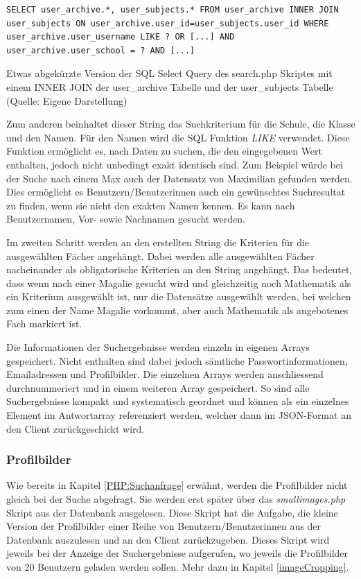 \documentclass[../main.tex]{subfiles}
\begin{document}
	 \begin{code}
	 	\begin{center}
	 		\begin{verbatim}
SELECT user_archive.*, user_subjects.* FROM user_archive INNER JOIN user_subjects ON user_archive.user_id=user_subjects.user_id WHERE user_archive.user_username LIKE ? OR [...] AND user_archive.user_school = ? AND [...]
	 		\end{verbatim}
	 		\caption{Etwas abgekürzte Version der SQL Select Query des search.php Skriptes mit einem INNER JOIN der user\_archive Tabelle und der user\_subjects Tabelle (Quelle: Eigene Darstellung)}\label{SQL:INNERJOIN}
		\end{center}
	\end{code}	
	 
	 Zum anderen beinhaltet dieser String das  Suchkriterium für die Schule, die Klasse und den Namen. Für den Namen wird die SQL Funktion \emph{LIKE} verwendet. Diese Funktion ermöglicht es, nach Daten zu suchen, die den eingegebenen Wert enthalten, jedoch nicht unbedingt exakt identisch sind. Zum Beispiel würde bei der Suche nach einem \glqq Max\grqq{} auch der Datensatz von \glqq Maximilian\grqq{} gefunden werden. Dies ermöglicht es Benutzern/Benutzerinnen auch ein gewünschtes Suchresultat zu finden, wenn sie nicht den exakten Namen kennen. Es kann nach Benutzernamen, Vor- sowie Nachnamen gesucht werden.
	 
	 Im zweiten Schritt werden an den erstellten String die Kriterien für die ausgewählten Fächer angehängt. Dabei werden alle ausgewählten Fächer nacheinander als obligatorische Kriterien an den String angehängt. Das bedeutet, dass wenn nach einer \glqq Magalie\grqq{} gesucht wird und gleichzeitig noch Mathematik als ein Kriterium ausgewählt ist, nur die Datensätze ausgewählt werden, bei welchen zum einen der Name \glqq Magalie\grqq{} vorkommt, aber auch Mathematik als angebotenes Fach markiert ist.
	 
	 Die Informationen der Suchergebnisse werden einzeln in eigenen Arrays gespeichert. Nicht enthalten sind dabei jedoch sämtliche Passwortinformationen, Emailadressen und Profilbilder. Die einzelnen Arrays werden anschliessend durchnummeriert und in einem weiteren Array gespeichert. So sind alle Suchergebnisse kompakt und systematisch geordnet und können als ein einzelnes Element im Antwortarray referenziert werden, welcher dann im JSON-Format an den Client zurückgeschickt wird.
	 
	 \subsubsection{Profilbilder}
	 Wie bereits in Kapitel \ref{PHP:Suchanfrage} erwähnt, werden die Profilbilder nicht gleich bei der Suche abgefragt. Sie werden erst später über das \emph{smallimages.php} Skript aus der Datenbank ausgelesen. Diese Skript hat die Aufgabe, die kleine Version der Profilbilder einer Reihe von Benutzern/Benutzerinnen aus der Datenbank auszulesen und an den Client zurückzugeben. Dieses Skript wird jeweils bei der Anzeige der Suchergebnisse aufgerufen, wo jeweils die Profilbilder von 20 Benutzern geladen werden sollen. Mehr dazu in Kapitel \ref{imageCropping}.
	 
\end{document}
